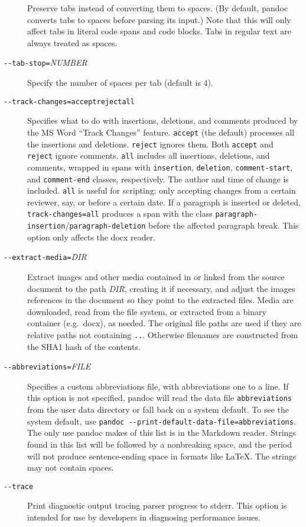 \documentclass[
]{article}
\begin{document}
\begin{description}
Preserve tabs instead of converting them to spaces. (By default, pandoc
converts tabs to spaces before parsing its input.) Note that this will
only affect tabs in literal code spans and code blocks. Tabs in regular
text are always treated as spaces.
\item[\texttt{-\/-tab-stop=}\emph{NUMBER}]
Specify the number of spaces per tab (default is 4).
\item[\texttt{-\/-track-changes=accept}\textbar{}\texttt{reject}\textbar{}\texttt{all}]
Specifies what to do with insertions, deletions, and comments produced
by the MS Word ``Track Changes'' feature. \texttt{accept} (the default)
processes all the insertions and deletions. \texttt{reject} ignores
them. Both \texttt{accept} and \texttt{reject} ignore comments.
\texttt{all} includes all insertions, deletions, and comments, wrapped
in spans with \texttt{insertion}, \texttt{deletion},
\texttt{comment-start}, and \texttt{comment-end} classes, respectively.
The author and time of change is included. \texttt{all} is useful for
scripting: only accepting changes from a certain reviewer, say, or
before a certain date. If a paragraph is inserted or deleted,
\texttt{track-changes=all} produces a span with the class
\texttt{paragraph-insertion}/\texttt{paragraph-deletion} before the
affected paragraph break. This option only affects the docx reader.
\item[\texttt{-\/-extract-media=}\emph{DIR}]
Extract images and other media contained in or linked from the source
document to the path \emph{DIR}, creating it if necessary, and adjust
the images references in the document so they point to the extracted
files. Media are downloaded, read from the file system, or extracted
from a binary container (e.g.~docx), as needed. The original file paths
are used if they are relative paths not containing \texttt{..}.
Otherwise filenames are constructed from the SHA1 hash of the contents.
\item[\texttt{-\/-abbreviations=}\emph{FILE}]
Specifies a custom abbreviations file, with abbreviations one to a line.
If this option is not specified, pandoc will read the data file
\texttt{abbreviations} from the user data directory or fall back on a
system default. To see the system default, use
\texttt{pandoc\ -\/-print-default-data-file=abbreviations}. The only use
pandoc makes of this list is in the Markdown reader. Strings found in
this list will be followed by a nonbreaking space, and the period will
not produce sentence-ending space in formats like LaTeX. The strings may
not contain spaces.
\item[\texttt{-\/-trace}]
Print diagnostic output tracing parser progress to stderr. This option
is intended for use by developers in diagnosing performance issues.
\end{description}
\end{document}
